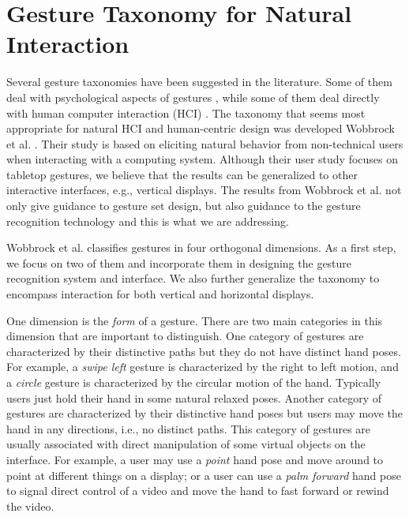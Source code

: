 \documentclass[conference]{IEEEtran}
\begin{document}
\section{Gesture Taxonomy for Natural Interaction}\label{sec:taxonomy}
Several gesture taxonomies have been suggested in the literature. Some of them
deal with psychological aspects of gestures \cite{kendon86, mcneill82}, while
some of them deal directly with human computer interaction (HCI) \cite{quek94,
quek95, Pavlovic97}. The taxonomy that seems most appropriate for natural HCI
and human-centric design was developed Wobbrock et al. \cite{wobbrock09}. Their
study is based on eliciting natural behavior from non-technical users when
interacting with a computing system. Although their user study focuses on
tabletop gestures, we believe that the results can be generalized to other
interactive interfaces, e.g., vertical displays. The results from Wobbrock et
al. not only give guidance to gesture set design, but also guidance to the
gesture recognition technology and this is what we are addressing.

Wobbrock et al. classifies gestures in four orthogonal dimensions. As a first
step, we focus on two of them and incorporate them in designing the
gesture recognition system and interface. We also further generalize the
taxonomy to encompass interaction for both vertical and horizontal displays.

One dimension is the \textit{form} of a gesture. There are two main categories
in this dimension that are important to distinguish. One category of gestures are characterized
by their distinctive paths but they do not have distinct hand poses. For
example, a \textit{swipe left} gesture is characterized by the right to left motion, and a \textit{circle} gesture is
characterized by the circular motion of the hand. Typically users just
hold their hand in some natural relaxed poses. Another category of gestures are
characterized by their distinctive hand poses but users may move the hand in any
directions, i.e., no distinct paths. This category of gestures are usually
associated with direct manipulation of some virtual objects on the interface.
For example, a user may use a \textit{point} hand pose and move around to point at different things on a display; or a user can use a \textit{palm forward} hand pose to signal direct
control of a video and move the hand to fast forward or rewind the video. 
\end{document}
